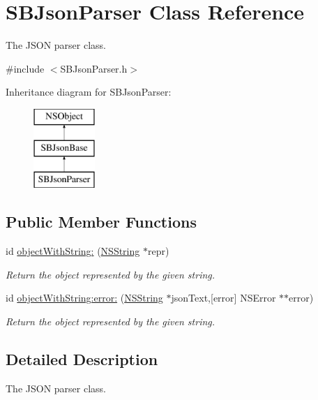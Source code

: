 \hypertarget{interface_s_b_json_parser}{
\section{\-S\-B\-Json\-Parser \-Class \-Reference}
\label{interface_s_b_json_parser}
}


\-The \-J\-S\-O\-N parser class.  




{\ttfamily \#include $<$\-S\-B\-Json\-Parser.\-h$>$}

\-Inheritance diagram for \-S\-B\-Json\-Parser\-:\begin{figure}[H]
\begin{center}
\leavevmode
\includegraphics[height=3.000000cm]{interface_s_b_json_parser}
\end{center}
\end{figure}
\subsection*{\-Public \-Member \-Functions}
\begin{DoxyCompactItemize}
\item 
id \hyperlink{interface_s_b_json_parser_a1ec40b986576044d58d30172b141c74c}{object\-With\-String\-:} (\hyperlink{class_n_s_string}{\-N\-S\-String} $\ast$repr)
\begin{DoxyCompactList}\small\item\em \-Return the object represented by the given string. \end{DoxyCompactList}\item 
id \hyperlink{interface_s_b_json_parser_a7a7fff47f41a08fa0defc4f628846e15}{object\-With\-String\-:error\-:} (\hyperlink{class_n_s_string}{\-N\-S\-String} $\ast$json\-Text,\mbox{[}error\mbox{]} \-N\-S\-Error $\ast$$\ast$error)
\begin{DoxyCompactList}\small\item\em \-Return the object represented by the given string. \end{DoxyCompactList}\end{DoxyCompactItemize}


\subsection{\-Detailed \-Description}
\-The \-J\-S\-O\-N parser class. 

